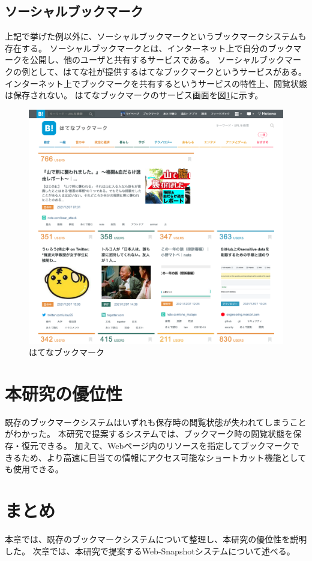 \subsection{ソーシャルブックマーク}
上記で挙げた例以外に、ソーシャルブックマークというブックマークシステムも存在する。
ソーシャルブックマークとは、インターネット上で自分のブックマークを公開し、他のユーザと共有するサービスである。
ソーシャルブックマークの例として、はてな社\cite{hatena}が提供するはてなブックマーク\cite{hatena-bookmark}というサービスがある。
インターネット上でブックマークを共有するというサービスの特性上、閲覧状態は保存されない。
はてなブックマークのサービス画面を図\ref{fig:hatena-bookmark}に示す。

\begin{figure}[htbp]
  \label{fig:hatena-bookmark}
  \begin{center}
    \includegraphics[bb=0 0 1020 940,width=15cm]{img/020_related_works/hatena-bookmark.pdf}
  \end{center}
  \caption{はてなブックマーク}
\end{figure}

\section{本研究の優位性}
既存のブックマークシステムはいずれも保存時の閲覧状態が失われてしまうことがわかった。
本研究で提案するシステムでは、ブックマーク時の閲覧状態を保存・復元できる。
加えて、Webページ内のリソースを指定してブックマークできるため、より高速に目当ての情報にアクセス可能なショートカット機能としても使用できる。

\section{まとめ}
本章では、既存のブックマークシステムについて整理し、本研究の優位性を説明した。
次章では、本研究で提案するWeb-Snapshotシステムについて述べる。